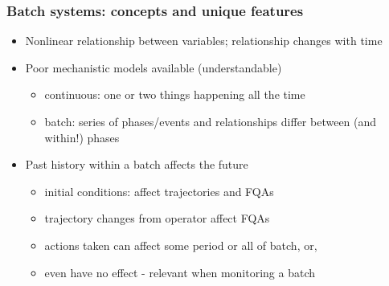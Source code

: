 \documentclass[handout, 12pt]{beamer}
\begin{document}
\begin{frame}\frametitle{Batch systems: concepts and unique features}

\begin{itemize}
	
	\item	Nonlinear relationship between variables; relationship changes with time \pause
	
	\item	Poor mechanistic models available (understandable)
	
			\begin{itemize}
				\item	continuous: one or two things happening all the time
				\item	batch: series of phases/events and relationships differ between (and within!) phases
			\end{itemize} \pause
			
	\item 	Past history within a batch affects the future
	
			\begin{itemize}
				\item	initial conditions: affect trajectories and FQAs								
				\item	trajectory changes from operator affect FQAs
				\item	actions taken can affect some period or all of batch, or,
				\item	even have no effect - relevant when monitoring a batch
			\end{itemize}
\end{itemize}
\end{frame}
\end{document}
